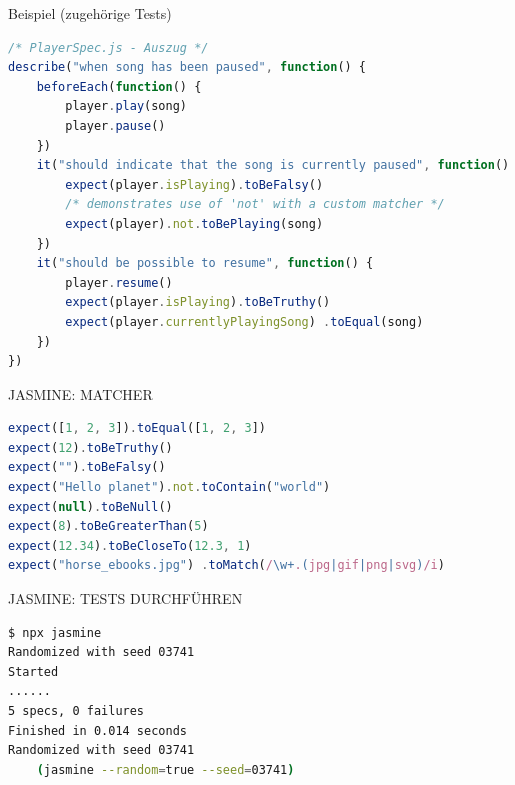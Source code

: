 \begin{concept}{Beispiel (zugehörige Tests)}
\begin{lstlisting}[language=JavaScript, style=base]
/* PlayerSpec.js - Auszug */
describe("when song has been paused", function() {
    beforeEach(function() {
        player.play(song)
        player.pause()
    })
    it("should indicate that the song is currently paused", function() {
        expect(player.isPlaying).toBeFalsy()
        /* demonstrates use of 'not' with a custom matcher */
        expect(player).not.toBePlaying(song)
    })
    it("should be possible to resume", function() {
        player.resume()
        expect(player.isPlaying).toBeTruthy()
        expect(player.currentlyPlayingSong) .toEqual(song)
    })
})
\end{lstlisting}
\end{concept}

\begin{code}{JASMINE: MATCHER}
\begin{lstlisting}[language=JavaScript, style=base]
expect([1, 2, 3]).toEqual([1, 2, 3])
expect(12).toBeTruthy()
expect("").toBeFalsy()
expect("Hello planet").not.toContain("world")
expect(null).toBeNull()
expect(8).toBeGreaterThan(5)
expect(12.34).toBeCloseTo(12.3, 1)
expect("horse_ebooks.jpg") .toMatch(/\w+.(jpg|gif|png|svg)/i)
\end{lstlisting}
\end{code}

\begin{KR}{JASMINE: TESTS DURCHFÜHREN}
\begin{lstlisting}[language=bash, style=base]
$ npx jasmine
Randomized with seed 03741
Started
......
5 specs, 0 failures
Finished in 0.014 seconds
Randomized with seed 03741 
    (jasmine --random=true --seed=03741)
\end{lstlisting}
\end{KR}